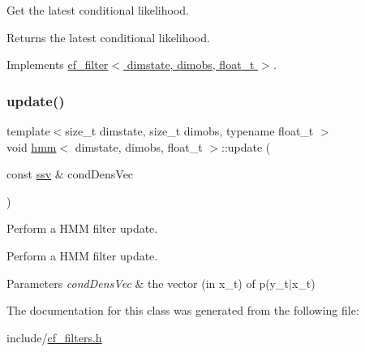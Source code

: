 Get the latest conditional likelihood. 

\begin{DoxyReturn}{Returns}
the latest conditional likelihood. 
\end{DoxyReturn}


Implements \hyperlink{classcf__filter_a11b26307172bf94b8075ed2cdb8fc09c}{cf\+\_\+filter$<$ dimstate, dimobs, float\+\_\+t $>$}.

\mbox{\label{classhmm_a5a25f1d14b38f0fae35a9072cfa0a368}} 
\subsubsection{\texorpdfstring{update()}{update()}}
{\footnotesize\ttfamily template$<$size\+\_\+t dimstate, size\+\_\+t dimobs, typename float\+\_\+t $>$ \\
void \hyperlink{classhmm}{hmm}$<$ dimstate, dimobs, float\+\_\+t $>$\+::update (\begin{DoxyParamCaption}\item[{const \hyperlink{classcf__filter_ad4bce534d6b7a494dae851846037c94b}{ssv} \&}]{cond\+Dens\+Vec }\end{DoxyParamCaption})}



Perform a H\+MM filter update. 

Perform a H\+MM filter update. 
\begin{DoxyParams}{Parameters}
{\em cond\+Dens\+Vec} & the vector (in x\+\_\+t) of p(y\+\_\+t$\vert$x\+\_\+t) \\
\hline
\end{DoxyParams}


The documentation for this class was generated from the following file\+:\begin{DoxyCompactItemize}
\item 
include/\hyperlink{cf__filters_8h}{cf\+\_\+filters.\+h}\end{DoxyCompactItemize}
